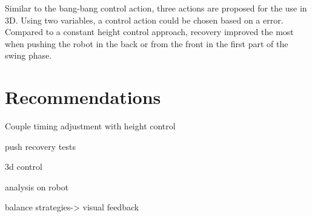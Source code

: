 Similar to the bang-bang control action, three actions are proposed for the use in \ac{3D}. Using two variables, a control action could be chosen based on a error. Compared to a constant height control approach, recovery improved the most when pushing the robot in the back or from the front in the first part of the swing phase. 

\section{Recommendations}

 Couple timing adjustment with height control
 
 push recovery tests
 
 3d control
 
 analysis on robot
 
 balance strategies-> visual feedback
